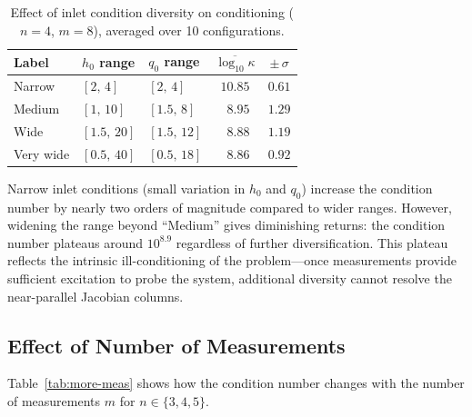 \begin{table}[htbp]
\centering
\caption{Effect of inlet condition diversity on conditioning ($n = 4$, $m = 8$), averaged over 10 configurations.}
\label{tab:diversity}
\begin{tabular}{l l l c c}
\toprule
Label & $h_0$ range & $q_0$ range & $\overline{\log_{10} \kappa}$ & $\pm\, \sigma$ \\
\midrule
Narrow    & $[2,\, 4]$     & $[2,\, 4]$     & $10.85$ & $0.61$ \\
Medium    & $[1,\, 10]$    & $[1.5,\, 8]$   & $\phantom{0}8.95$ & $1.29$ \\
Wide      & $[1.5,\, 20]$  & $[1.5,\, 12]$  & $\phantom{0}8.88$ & $1.19$ \\
Very wide & $[0.5,\, 40]$  & $[0.5,\, 18]$  & $\phantom{0}8.86$ & $0.92$ \\
\bottomrule
\end{tabular}
\end{table}

Narrow inlet conditions (small variation in $h_0$ and $q_0$) increase the condition number by nearly two orders of magnitude compared to wider ranges.
However, widening the range beyond ``Medium'' gives diminishing returns: the condition number plateaus around $10^{8.9}$ regardless of further diversification.
This plateau reflects the intrinsic ill-conditioning of the problem---once measurements provide sufficient excitation to probe the system, additional diversity cannot resolve the near-parallel Jacobian columns.


\subsection{Effect of Number of Measurements}

Table~\ref{tab:more-meas} shows how the condition number changes with the number of measurements $m$ for $n \in \{3, 4, 5\}$.


